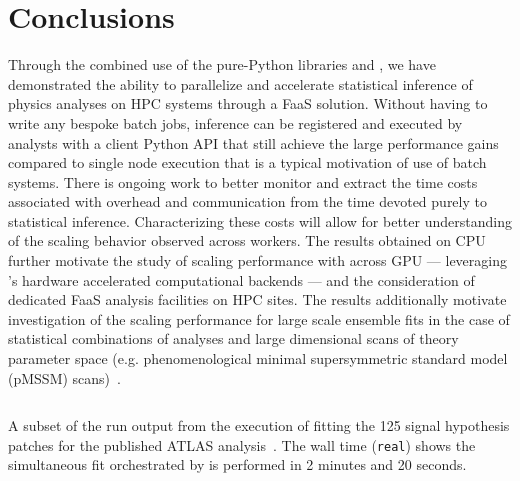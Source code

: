 \section{Conclusions}\label{sec:conclusions}

Through the combined use of the pure-Python libraries \funcX{} and \pyhf{}, we have demonstrated the ability to parallelize and accelerate statistical inference of physics analyses on HPC systems through a FaaS solution.
Without having to write any bespoke batch jobs, inference can be registered and executed by analysts with a client Python API that still achieve the large performance gains compared to single node execution that is a typical motivation of use of batch systems.
There is ongoing work to better monitor and extract the time costs associated with overhead and communication from the time devoted purely to statistical inference.
Characterizing these costs will allow for better understanding of the scaling behavior observed across workers.
The results obtained on CPU further motivate the study of scaling performance with \funcX{} across GPU --- leveraging \pyhf{}'s hardware accelerated computational backends --- and the consideration of dedicated FaaS analysis facilities on HPC sites.
The results additionally motivate investigation of the scaling performance for large scale ensemble fits in the case of statistical combinations of analyses and large dimensional scans of theory parameter space (e.g. phenomenological minimal supersymmetric standard model (pMSSM) scans)~\cite{SUSY-2014-08,Ambrogi:2017lov}.

\begin{listing}
 \inputminted{text}{src/code/funcX_demo_output.txt}
 \caption{A subset of the run output from the execution of fitting the 125 signal hypothesis patches for the published ATLAS analysis~\cite{SUSY-2019-08}.
 The wall time (\texttt{real}) shows the simultaneous fit orchestrated by \funcX{} is performed in 2 minutes and 20 seconds.}
 \label{lst:funcX_demo_output}
\end{listing}
